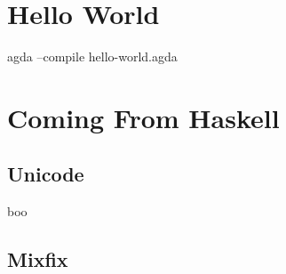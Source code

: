 \documentclass[12pt]{article}
\begin{document}
\section{Hello World}


\begin{neolisting}
agda --compile hello-world.agda
\end{neolisting}

\section{Coming From Haskell}
\subsection{Unicode}
boo

\subsection{Mixfix}

\printbibliography{}
\end{document}
